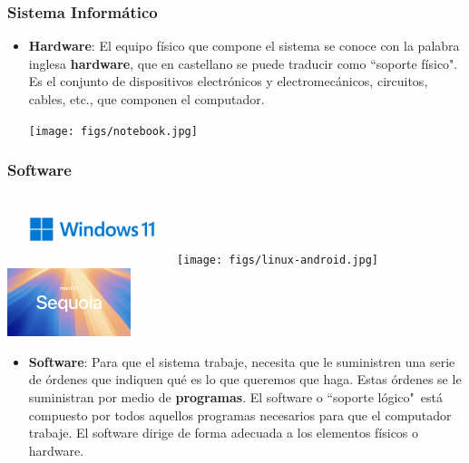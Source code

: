 \documentclass[aspectratio=169]{beamer}
\begin{document}
\begin{frame}[fragile]\frametitle{Sistema Informático}
\begin{itemize}
\item \textbf{Hardware}: El equipo físico que compone el sistema se conoce con la palabra inglesa \textbf{hardware}, que en castellano se puede traducir como ``soporte físico". Es el conjunto de dispositivos electrónicos y electromecánicos, circuitos, cables, etc., que componen el computador.
\begin{center}
\texttt{[image: figs/notebook.jpg]}
\end{center}
\end{itemize}
\end{frame}

\begin{frame}[fragile]\frametitle{Software}
\begin{center}
\includegraphics[height=2cm]{figs/windows-11-logo_web.png}\hfill\texttt{[image: figs/linux-android.jpg]}\hfill\includegraphics[height=2cm]{figs/macOS_Sequoia.png}
\end{center}
\begin{itemize}
\item \textbf{Software}: Para que el sistema trabaje, necesita que le suministren una serie de órdenes que indiquen qué es lo que queremos que haga. Estas órdenes se le suministran por medio de \textbf{programas}. El software o ``soporte lógico"\, está compuesto por todos aquellos programas necesarios para que el computador trabaje. El software dirige de forma adecuada a los elementos físicos o hardware.
\end{itemize}
\end{frame}
\end{document}
